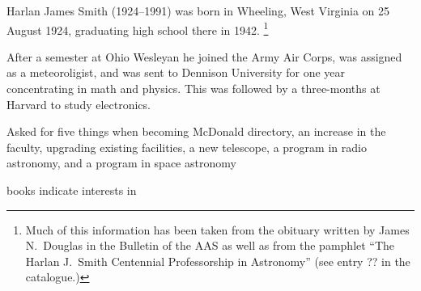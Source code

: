 

Harlan James Smith (1924--1991) was born in Wheeling, West Virginia on
25 August 1924, graduating high school there in 1942.
\footnote{Much of this information has been
taken from the obituary written by James N.~Douglas in the Bulletin of
the AAS\cite{Douglas1992Harlan} as well as from the pamphlet ``The
Harlan J.~Smith Centennial Professorship in Astronomy'' (see entry
?? in the catalogue.)} 

After a semester at Ohio Wesleyan he joined the Army Air Corps, was
assigned as a meteoroligist, and was sent to Dennison University for
one year concentrating in math and physics. This was followed by a
three-months at Harvard to study electronics.

Asked for five things when becoming McDonald directory, an increase in
the faculty, upgrading existing facilities, a new telescope, a program
in radio astronomy, and a program in space astronomy

books indicate interests in

